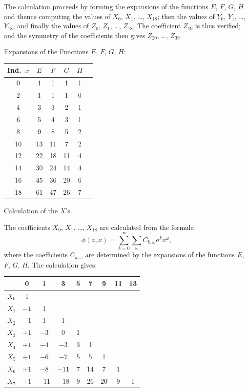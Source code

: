 \documentclass[11pt,a4paper]{article}
\begin{document}
\clearpage
The calculation proceeds by forming the expansions of the functions $E$, $F$, $G$, $H$ and thence computing the values of $X_0$, $X_1$, \dots, $X_{18}$; then the values of $Y_0$, $Y_1$, \dots, $Y_{18}$; and finally the values of $Z_0$, $Z_1$, \dots, $Z_{18}$. The coefficient $Z_{19}$ is thus verified; and the symmetry of the coefficients then gives $Z_{20}$, \dots, $Z_{39}$.

Expansions of the Functions $E$, $F$, $G$, $H$:

\begin{center}
\begin{tabular}{c|ccccc}
Ind.\ $x$ & $E$ & $F$ & $G$ & $H$ \\
\hline
0 & 1 & 1 & 1 & 1 \\
2 & 1 & 1 & 1 & 0 \\
4 & 3 & 3 & 2 & 1 \\
6 & 5 & 4 & 3 & 1 \\
8 & 9 & 8 & 5 & 2 \\
10 & 13 & 11 & 7 & 2 \\
12 & 22 & 18 & 11 & 4 \\
14 & 30 & 24 & 14 & 4 \\
16 & 45 & 36 & 20 & 6 \\
18 & 61 & 47 & 26 & 7
\end{tabular}
\end{center}

\clearpage
Calculation of the $X$'s.

The coefficients $X_0$, $X_1$, \dots, $X_{18}$ are calculated from the formula
\[
\phi(a, x) = \sum_{k=0}^{\infty} \sum_{\omega} C_{k,\omega} a^k x^{\omega},
\]
where the coefficients $C_{k,\omega}$ are determined by the expansions of the functions $E$, $F$, $G$, $H$. The calculation gives:

\begin{center}
\begin{tabular}{c|cccccccc}
& 0 & 1 & 3 & 5 & 7 & 9 & 11 & 13 \\
\hline
$X_0$ & 1 & & & & & & & \\
$X_1$ & $-1$ & 1 & & & & & & \\
$X_2$ & $-1$ & 1 & 1 & & & & & \\
$X_3$ & $+1$ & $-3$ & 0 & 1 & & & & \\
$X_4$ & $+1$ & $-4$ & $-3$ & 3 & 1 & & & \\
$X_5$ & $+1$ & $-6$ & $-7$ & 5 & 5 & 1 & & \\
$X_6$ & $+1$ & $-8$ & $-11$ & 7 & 14 & 7 & 1 & \\
$X_7$ & $+1$ & $-11$ & $-18$ & 9 & 26 & 20 & 9 & 1
\end{tabular}
\end{center}
\end{document}
